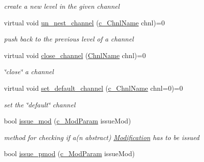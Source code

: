 \begin{DoxyCompactItemize}
\begin{DoxyCompactList}\small\item\em create a new level in the given channel \end{DoxyCompactList}\item 
virtual void \mbox{\hyperlink{class_s_m_spp__di__unipi__it_1_1_observer_a668d3bd70f67db2213601cf671f115d9}{un\+\_\+nest\+\_\+channel}} (\mbox{\hyperlink{class_s_m_spp__di__unipi__it_1_1_observer_aa9ad8de42ffaf90023bfed5c085ad8bc}{c\+\_\+\+Chnl\+Name}} chnl)=0
\begin{DoxyCompactList}\small\item\em push back to the previous level of a channel \end{DoxyCompactList}\item 
virtual void \mbox{\hyperlink{class_s_m_spp__di__unipi__it_1_1_observer_ae807c62016502d692338e1ab6578fc76}{close\+\_\+channel}} (\mbox{\hyperlink{class_s_m_spp__di__unipi__it_1_1_observer_a54ce8db639626e45b1f20c289baa989b}{Chnl\+Name}} chnl)=0
\begin{DoxyCompactList}\small\item\em \char`\"{}close\char`\"{} a channel \end{DoxyCompactList}\item 
virtual void \mbox{\hyperlink{class_s_m_spp__di__unipi__it_1_1_observer_a47f7642288d3e09ad9c792f86797840d}{set\+\_\+default\+\_\+channel}} (\mbox{\hyperlink{class_s_m_spp__di__unipi__it_1_1_observer_aa9ad8de42ffaf90023bfed5c085ad8bc}{c\+\_\+\+Chnl\+Name}} chnl=0)=0
\begin{DoxyCompactList}\small\item\em set the \char`\"{}default\char`\"{} channel \end{DoxyCompactList}\item 
bool \mbox{\hyperlink{class_s_m_spp__di__unipi__it_1_1_observer_aba36085f2ffb7811a1843482d5e83063}{issue\+\_\+mod}} (\mbox{\hyperlink{group___modification___t_y_p_e_s_ga544246d8c462e9a2d817c2c30797968f}{c\+\_\+\+Mod\+Param}} issue\+Mod)
\begin{DoxyCompactList}\small\item\em method for checking if a(n abstract) \mbox{\hyperlink{class_s_m_spp__di__unipi__it_1_1_modification}{Modification}} has to be issued \end{DoxyCompactList}\item 
bool \mbox{\hyperlink{class_s_m_spp__di__unipi__it_1_1_observer_adbb3f266845b94b3cc19a549c2634f3d}{issue\+\_\+pmod}} (\mbox{\hyperlink{group___modification___t_y_p_e_s_ga544246d8c462e9a2d817c2c30797968f}{c\+\_\+\+Mod\+Param}} issue\+Mod)

\end{DoxyCompactItemize}
